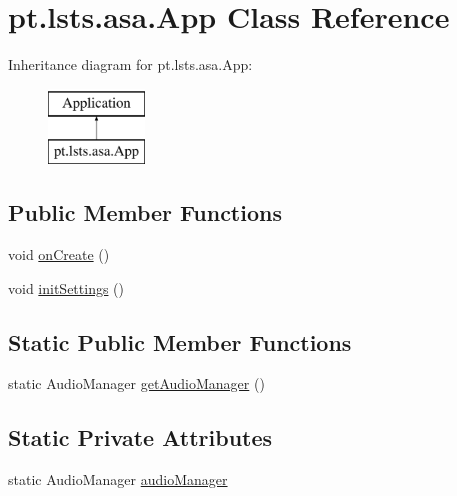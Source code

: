 \hypertarget{classpt_1_1lsts_1_1asa_1_1App}{}\section{pt.\+lsts.\+asa.\+App Class Reference}
\label{classpt_1_1lsts_1_1asa_1_1App}
Inheritance diagram for pt.\+lsts.\+asa.\+App\+:\begin{figure}[H]
\begin{center}
\leavevmode
\includegraphics[height=2.000000cm]{classpt_1_1lsts_1_1asa_1_1App}
\end{center}
\end{figure}
\subsection*{Public Member Functions}
\begin{DoxyCompactItemize}
\item 
void \hyperlink{classpt_1_1lsts_1_1asa_1_1App_a3a8e529a72a95a644541b5c841afdcce}{on\+Create} ()
\item 
void \hyperlink{classpt_1_1lsts_1_1asa_1_1App_ac43f2d10efb22342f021d38fd4be041b}{init\+Settings} ()
\end{DoxyCompactItemize}
\subsection*{Static Public Member Functions}
\begin{DoxyCompactItemize}
\item 
static Audio\+Manager \hyperlink{classpt_1_1lsts_1_1asa_1_1App_a5154c0d421fd36b0ad2632a5558a0a0c}{get\+Audio\+Manager} ()
\end{DoxyCompactItemize}
\subsection*{Static Private Attributes}
\begin{DoxyCompactItemize}
\item 
static Audio\+Manager \hyperlink{classpt_1_1lsts_1_1asa_1_1App_aab071fb193087c96ae6ee746e694e8ff}{audio\+Manager}
\end{DoxyCompactItemize}


